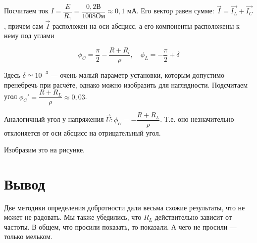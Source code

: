 \documentclass[a4paper, 12pt]{article}%
\begin{document}
Посчитаем ток $ I = \dfrac{E}{R_1} = \dfrac{0,2 \text{В}}{1008 \text{Ом}} \approx 0,1 $ мА. Его вектор равен сумме: $ \vec{I} = \vec{I_L} + \vec{I_C} $, причем сам $ \vec{I} $ расположен на оси абсцисс, а его компоненты расположены к нему под углами

\[\phi_C = \dfrac{\pi}{2} - \dfrac{R + R_l}{\rho}, \quad \phi_L = -\dfrac{\pi}{2} + \delta\]

Здесь $ \delta \simeq 10^{-3}$ --- очень малый параметр установки, которым допустимо пренебречь при расчёте, однако можно изобразить для наглядности. Подсчитаем угол $ \phi_C' =   \dfrac{R + R_L}{\rho} \approx 0,03 $. 

Аналогичный угол у напряжения $ \vec{U}: \phi_U = - \dfrac{R + R_L}{\rho} $. Т.е. оно незначительно отклоняется от оси абсцисс на отрицательный угол.

Изобразим это на рисунке.

\textbf{    } 

\textbf{    } 

\section*{Вывод}
Две методики определения добротности дали весьма схожие результаты, что не может не радовать. Мы также убедились, что $R_L$ действительно зависит от частоты. В общем, что просили показать, то показали. А чего не просили --- только мельком.
\end{document}
